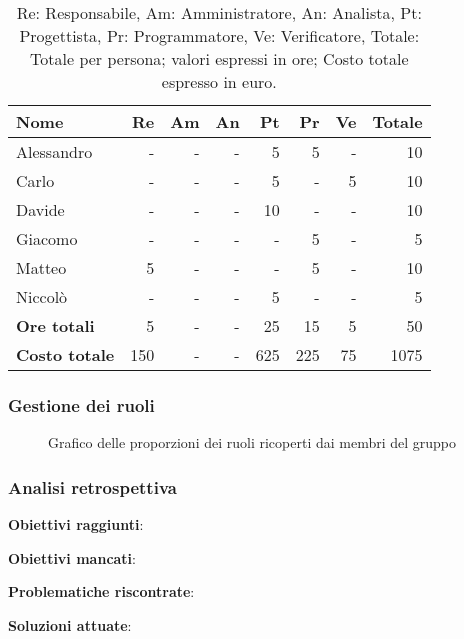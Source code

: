 \begin{table}[H]
	\centering
	\begin{tabular}{l|r|r|r|r|r|r|r}
		\textbf{Nome}         & \textbf{Re} & \textbf{Am} & \textbf{An} & \textbf{Pt} & \textbf{Pr} & \textbf{Ve} & \textbf{Totale} \\
		\hline
		Alessandro            & -           & -           & -           & 5           & 5           & -           & 10              \\
		Carlo                 & -           & -           & -           & 5           & -           & 5           & 10              \\
		Davide                & -           & -           & -           & 10          & -           & -           & 10              \\
		Giacomo               & -           & -           & -           & -           & 5           & -           & 5               \\
		Matteo                & 5           & -           & -           & -           & 5           & -           & 10              \\
		Niccolò               & -           & -           & -           & 5           & -           & -           & 5               \\
		\hline
		\textbf{Ore totali}   & 5           & -           & -           & 25          & 15          & 5           & 50              \\
		\textbf{Costo totale} & 150         & -           & -           & 625         & 225         & 75          & 1075
	\end{tabular}
	\caption{Re: Responsabile, Am: Amministratore, An: Analista, Pt: Progettista,
		Pr: Programmatore, Ve: Verificatore, Totale: Totale per persona; valori espressi in ore; Costo totale espresso in euro.}
\end{table}

\newpage
\subsubsection{Gestione dei ruoli}

\begin{figure}[h]
	\centering
	\caption{Grafico delle proporzioni dei ruoli ricoperti dai membri del gruppo}
\end{figure}

\subsubsection{Analisi retrospettiva}

\textbf{Obiettivi raggiunti}:

\textbf{Obiettivi mancati}:

\textbf{Problematiche riscontrate}:

\textbf{Soluzioni attuate}:
